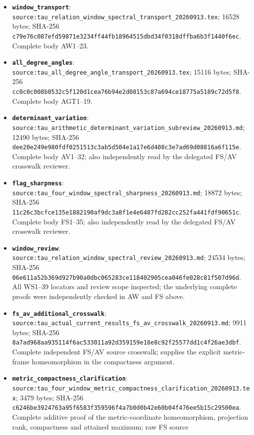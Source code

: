 \begin{itemize}
  \nolinkurl{24cf7ce5be6a43cc656641b516185df10b2e4d7824600ece657120d1c549deae}.
  Complete body AT1--22 and AT2a.
\item
  \textbf{\nolinkurl{window_transport}}:
  \nolinkurl{source:tau_relation_window_spectral_transport_20260913.tex};
  16528 bytes; SHA-256
  \nolinkurl{c79e76c087efd59871e3234ff44fb18964515dbd34f0318dffba6b3f1440f6ec}.
  Complete body AW1--23.
\item
  \textbf{\nolinkurl{all_degree_angles}}:
  \nolinkurl{source:tau_all_degree_angle_transport_20260913.tex}; 15116
  bytes; SHA-256
  \nolinkurl{cc0c0c008b0532c5f120d1cea76b94e2d08153c87a694ce18775a5189c72d5f8}.
  Complete body AGT1--19.
\item
  \textbf{\nolinkurl{determinant_variation}}:
  \nolinkurl{source:tau_arithmetic_determinant_variation_subreview_20260913.md};
  12490 bytes; SHA-256
  \nolinkurl{dee20e249e980fdf0251513c3ab5d504e1a17e6d408c3e7ad69d08816a6f115e}.
  Complete body AV1--32; also independently read by the delegated FS/AV
  crosswalk reviewer.
\item
  \textbf{\nolinkurl{flag_sharpness}}:
  \nolinkurl{source:tau_four_window_spectral_sharpness_20260913.md};
  18872 bytes; SHA-256
  \nolinkurl{11c26c3bcfce135e1882190af9dc3a8f1e4e6487fd282cc252fa441fdf90651c}.
  Complete body FS1--35; also independently read by the delegated FS/AV
  crosswalk reviewer.
\item
  \textbf{\nolinkurl{window_review}}:
  \nolinkurl{source:tau_relation_window_spectral_review_20260913.md};
  24534 bytes; SHA-256
  \nolinkurl{06e611a52b369d927b90a0dbc065283ce118402905cea046fe028c81f507d96d}.
  All WS1--39 locators and review scope inspected; the underlying
  complete proofs were independently checked in AW and FS above.
\item
  \textbf{\nolinkurl{fs_av_additional_crosswalk}}:
  \nolinkurl{source:tau_actual_current_results_fs_av_crosswalk_20260913.md};
  9911 bytes; SHA-256
  \nolinkurl{8a7ad968aa935114f6ac533011a92d359159e18e8c92f25577dd1c4f26ae3dbf}.
  Complete independent FS/AV source crosswalk; supplies the explicit
  metric-frame homeomorphism in the compactness argument.
\item
  \textbf{\nolinkurl{metric_compactness_clarification}}:
  \nolinkurl{source:tau_four_window_metric_compactness_clarification_20260913.tex};
  3479 bytes; SHA-256
  \nolinkurl{c6246be3924763a95f6583f359596f4a7b0d0b42e60b04f476ee5b15c29500ea}.
  Complete additive proof of the metric-coordinate homeomorphism,
  projection rank, compactness and attained maximum; raw FS source

\end{itemize}
